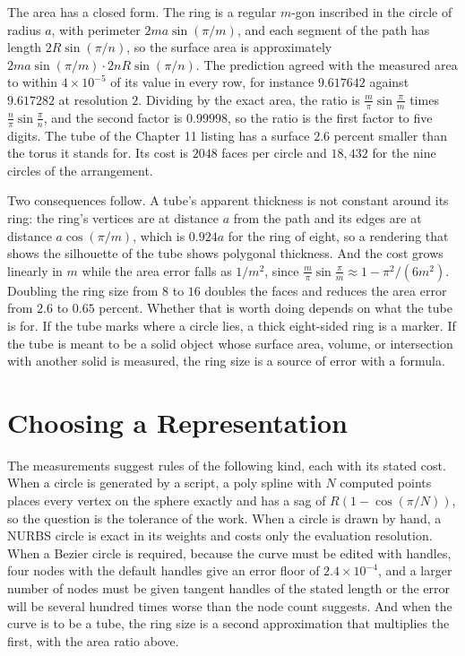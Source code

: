 The area has a closed form. The ring is a regular $m$-gon inscribed in the circle of radius $a$, with perimeter $2ma\sin(\pi/m)$, and each segment of the path has length $2R\sin(\pi/n)$, so the surface area is approximately $2ma\sin(\pi/m)\cdot2nR\sin(\pi/n)$. The prediction agreed with the measured area to within $4\times10^{-5}$ of its value in every row, for instance $9.617642$ against $9.617282$ at resolution $2$. Dividing by the exact area, the ratio is $\tfrac m\pi\sin\tfrac\pi m$ times $\tfrac n\pi\sin\tfrac\pi n$, and the second factor is $0.99998$, so the ratio is the first factor to five digits. The tube of the Chapter 11 listing has a surface $2.6$ percent smaller than the torus it stands for. Its cost is $2048$ faces per circle and $18{,}432$ for the nine circles of the arrangement.

Two consequences follow. A tube's apparent thickness is not constant around its ring: the ring's vertices are at distance $a$ from the path and its edges are at distance $a\cos(\pi/m)$, which is $0.924a$ for the ring of eight, so a rendering that shows the silhouette of the tube shows polygonal thickness. And the cost grows linearly in $m$ while the area error falls as $1/m^2$, since $\tfrac m\pi\sin\tfrac\pi m\approx1-\pi^2/(6m^2)$. Doubling the ring size from $8$ to $16$ doubles the faces and reduces the area error from $2.6$ to $0.65$ percent. Whether that is worth doing depends on what the tube is for. If the tube marks where a circle lies, a thick eight-sided ring is a marker. If the tube is meant to be a solid object whose surface area, volume, or intersection with another solid is measured, the ring size is a source of error with a formula.

\section{Choosing a Representation}

The measurements suggest rules of the following kind, each with its stated cost. When a circle is generated by a script, a poly spline with $N$ computed points places every vertex on the sphere exactly and has a sag of $R(1-\cos(\pi/N))$, so the question is the tolerance of the work. When a circle is drawn by hand, a NURBS circle is exact in its weights and costs only the evaluation resolution. When a Bezier circle is required, because the curve must be edited with handles, four nodes with the default handles give an error floor of $2.4\times10^{-4}$, and a larger number of nodes must be given tangent handles of the stated length or the error will be several hundred times worse than the node count suggests. And when the curve is to be a tube, the ring size is a second approximation that multiplies the first, with the area ratio above.


